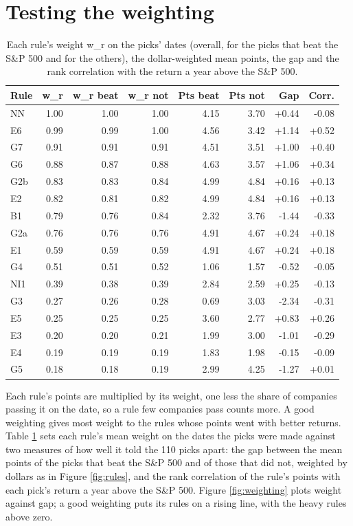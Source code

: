 \documentclass[11pt,a4paper]{article}
\begin{document}
\section{Testing the weighting}
\label{app:weighting}
\begin{table}[H]
\centering
\small
\caption{Each rule's weight w\_r on the picks' dates (overall, for the picks that beat the S\&P 500 and for the others), the dollar-weighted mean points, the gap and the rank correlation with the return a year above the S\&P 500.}\label{tab:weighting}
\begin{tabular}{l r r r r r r r}
\hline
Rule & w\_r & w\_r beat & w\_r not & Pts beat & Pts not & Gap & Corr. \\
\hline
NN & 1.00 & 1.00 & 1.00 & 4.15 & 3.70 & +0.44 & -0.08 \\
E6 & 0.99 & 0.99 & 1.00 & 4.56 & 3.42 & +1.14 & +0.52 \\
G7 & 0.91 & 0.91 & 0.91 & 4.51 & 3.51 & +1.00 & +0.40 \\
G6 & 0.88 & 0.87 & 0.88 & 4.63 & 3.57 & +1.06 & +0.34 \\
G2b & 0.83 & 0.83 & 0.84 & 4.99 & 4.84 & +0.16 & +0.13 \\
E2 & 0.82 & 0.81 & 0.82 & 4.99 & 4.84 & +0.16 & +0.13 \\
B1 & 0.79 & 0.76 & 0.84 & 2.32 & 3.76 & -1.44 & -0.33 \\
G2a & 0.76 & 0.76 & 0.76 & 4.91 & 4.67 & +0.24 & +0.18 \\
E1 & 0.59 & 0.59 & 0.59 & 4.91 & 4.67 & +0.24 & +0.18 \\
G4 & 0.51 & 0.51 & 0.52 & 1.06 & 1.57 & -0.52 & -0.05 \\
NI1 & 0.39 & 0.38 & 0.39 & 2.84 & 2.59 & +0.25 & -0.13 \\
G3 & 0.27 & 0.26 & 0.28 & 0.69 & 3.03 & -2.34 & -0.31 \\
E5 & 0.25 & 0.25 & 0.25 & 3.60 & 2.77 & +0.83 & +0.26 \\
E3 & 0.20 & 0.20 & 0.21 & 1.99 & 3.00 & -1.01 & -0.29 \\
E4 & 0.19 & 0.19 & 0.19 & 1.83 & 1.98 & -0.15 & -0.09 \\
G5 & 0.18 & 0.18 & 0.19 & 2.99 & 4.25 & -1.27 & +0.01 \\
\hline
\end{tabular}
\end{table}
Each rule's points are multiplied by its weight, one less the share of companies passing it on the date, so a rule few companies pass counts more. A good weighting gives most weight to the rules whose points went with better returns. Table \ref{tab:weighting} sets each rule's mean weight on the dates the picks were made against two measures of how well it told the 110 picks apart: the gap between the mean points of the picks that beat the S\&P 500 and of those that did not, weighted by dollars as in Figure \ref{fig:rules}, and the rank correlation of the rule's points with each pick's return a year above the S\&P 500. Figure \ref{fig:weighting} plots weight against gap; a good weighting puts its rules on a rising line, with the heavy rules above zero.
\end{document}
